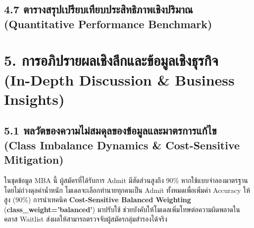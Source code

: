 \documentclass[12pt,a4paper]{article}
\newcommand{\codevar}[1]{\textcolor{codeaccent}{\textbf{#1}}}
\begin{document}
\clearpage
\subsection*{4.7 ตารางสรุปเปรียบเทียบประสิทธิภาพเชิงปริมาณ\\ \normalsize(Quantitative Performance Benchmark)}

\begin{table}[H]
\centering
\caption{ตารางสรุปผลการทดลองเปรียบเทียบประสิทธิภาพแบบจำลองทั้ง 3 สถาปัตยกรรม}
\end{table}

\section*{5. การอภิปรายผลเชิงลึกและข้อมูลเชิงธุรกิจ\\ \large(In-Depth Discussion \& Business Insights)}

\subsection*{5.1 พลวัตของความไม่สมดุลของข้อมูลและมาตรการแก้ไข\\ \normalsize(Class Imbalance Dynamics \& Cost-Sensitive Mitigation)}
ในชุดข้อมูล MBA นี้ ผู้สมัครที่ได้รับการ Admit มีสัดส่วนสูงถึง 90\% หากใช้แบบจำลองมาตรฐานโดยไม่ถ่วงดุลค่าน้ำหนัก โมเดลจะเลือกทำนายทุกคนเป็น Admit ทั้งหมดเพื่อเพิ่มค่า Accuracy ให้สูง ($90\%$) การนำเทคนิค \textbf{Cost-Sensitive Balanced Weighting} (\codevar{class\_weight='balanced'}) มาปรับใช้ ช่วยบังคับให้โมเดลเพิ่มโทษต่อความผิดพลาดในคลาส Waitlist ส่งผลให้สามารถตรวจจับผู้สมัครกลุ่มสำรองได้จริง
\end{document}

